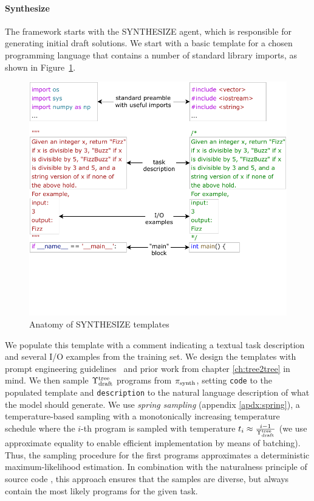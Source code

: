 \paragraph{Synthesize}

The framework starts with the SYNTHESIZE agent, which is responsible for generating initial draft solutions.
We start with a basic template for a chosen programming language that contains a number of standard library imports, as shown in Figure~\ref{fig:template}.

\begin{figure}
    \centering
    \includegraphics[width=\linewidth, trim={0mm 40mm 0mm 0mm}, clip]{images/Templates-new-v2.pdf}
    \caption{Anatomy of SYNTHESIZE templates}
    \label{fig:template}
\end{figure}

We populate this template with a comment indicating a textual task description and several I/O examples from the training set.
We design the templates with prompt engineering guidelines~\cite{PromptEngineering} and prior work from chapter \ref{ch:tree2tree} in mind.
We then sample $\Upsilon^\text{tree}_\text{draft}$ programs from $ \pi_\text{synth} $, setting \texttt{code} to the populated template and \texttt{description} to the natural language description of what the model should generate.
We use \emph{spring sampling} (appendix \ref{apdx:spring}), a temperature-based sampling with a monotonically increasing temperature schedule where the $i$-th program is sampled with temperature $t_i \approx \frac{i-1}{\Upsilon^\text{tree}_\text{draft}}$ (we use approximate equality to enable efficient implementation by means of batching).
Thus, the sampling procedure for the first programs approximates a deterministic maximum-likelihood estimation.
In combination with the naturalness principle of source code \cite{allamanis2018:survey,jiangBugsLeadUnnaturalness2022}, this approach ensures that the samples are diverse, but always contain the most likely programs for the given task.

